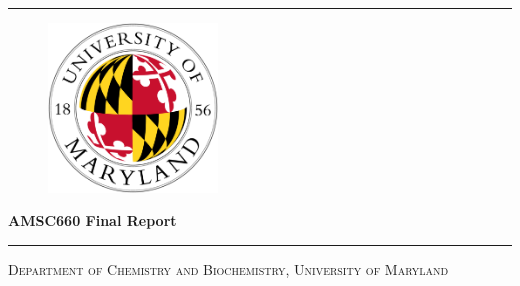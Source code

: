 \documentclass[12pt]{article}
\newcommand{\0}{\boldsymbol{0}}
\begin{document}
\setlength{\parindent}{0pt}

\begin{titlepage}
    \centering


    \rule{\textwidth}{1pt}   %
    \vspace{0.04\textheight}  %


    \begin{figure}[ht]
      \centering
      \includegraphics[width=0.4\textwidth]{../img/University_of_Maryland_seal.png}
    \end{figure}

    \vspace{0.07\textheight}
        {\Huge \textbf{AMSC660 Final Report}}  %

    
    \vspace{0.03\textheight}


    \rule{0.83\textwidth}{0.4pt}  %

    \vspace{0.04\textheight}  %


    {\large \textsc{Department of Chemistry and Biochemistry, University of Maryland}}


\end{titlepage}
\end{document}

